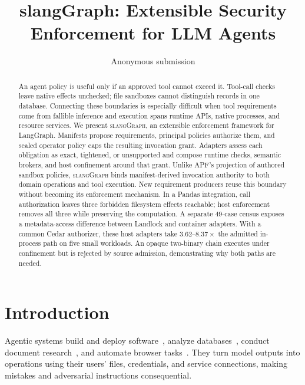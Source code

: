 \documentclass[letterpaper,twocolumn,10pt]{article}
\newcommand{\sys}{\textsc{slangGraph}\xspace}
\begin{document}
\date{}
\title{\Large \bf slangGraph: Extensible Security Enforcement for LLM Agents}
\author{Anonymous submission}
\maketitle

\begin{abstract}
An agent policy is useful only if an approved tool cannot exceed it. Tool-call
checks leave native effects unchecked; file sandboxes cannot distinguish records
in one database. Connecting these boundaries is especially difficult when tool
requirements come from fallible inference and execution spans runtime APIs,
native processes, and resource services.
We present \sys, an extensible enforcement framework for LangGraph. Manifests
propose requirements, principal policies authorize them, and sealed operator
policy caps the resulting invocation grant. Adapters assess each obligation as
exact, tightened, or unsupported and compose runtime checks, semantic brokers,
and host confinement around that grant. Unlike APF's projection of authored
sandbox policies, \sys binds manifest-derived invocation authority to both
domain operations and tool execution. New requirement producers reuse this
boundary without becoming its enforcement mechanism.
In a Pandas integration, call authorization leaves three forbidden filesystem
effects reachable; host enforcement removes all three while preserving the
computation. A separate 49-case census exposes a metadata-access difference
between Landlock and container adapters. With a common Cedar authorizer, these
host adapters take $3.62$--$8.37\times$ the admitted in-process path on five
small workloads. An opaque two-binary chain executes under confinement but is
rejected by source admission, demonstrating why both paths are needed.
\end{abstract}

\section{Introduction}
\label{sec:intro}

Agentic systems build and deploy software~\cite{replitagent}, analyze
databases~\cite{aidatascienceteam}, conduct document
research~\cite{opennotebook}, and automate browser tasks~\cite{browseruse}.
They turn model outputs into operations using their users' files, credentials,
and service connections, making mistakes and adversarial instructions consequential.
\end{document}
